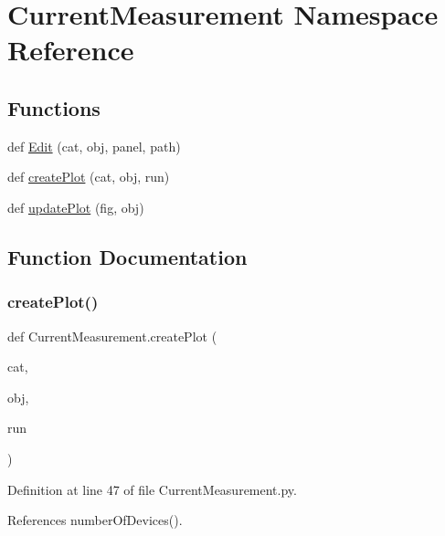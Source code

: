 \hypertarget{namespaceCurrentMeasurement}{}\section{Current\+Measurement Namespace Reference}
\label{namespaceCurrentMeasurement}
\subsection*{Functions}
\begin{DoxyCompactItemize}
\item 
def \hyperlink{namespaceCurrentMeasurement_a7057dd96433e4643ae9a6d3b924378a0}{Edit} (cat, obj, panel, path)
\item 
def \hyperlink{namespaceCurrentMeasurement_abb4e5049746f99263fabbdb1e62b35df}{create\+Plot} (cat, obj, run)
\item 
def \hyperlink{namespaceCurrentMeasurement_a7de64b4b34fccae5633afcb56d04363f}{update\+Plot} (fig, obj)
\end{DoxyCompactItemize}


\subsection{Function Documentation}
\mbox{\label{namespaceCurrentMeasurement_abb4e5049746f99263fabbdb1e62b35df}} 
\subsubsection{\texorpdfstring{create\+Plot()}{createPlot()}}
{\footnotesize\ttfamily def Current\+Measurement.\+create\+Plot (\begin{DoxyParamCaption}\item[{}]{cat,  }\item[{}]{obj,  }\item[{}]{run }\end{DoxyParamCaption})}



Definition at line 47 of file Current\+Measurement.\+py.



References number\+Of\+Devices().


